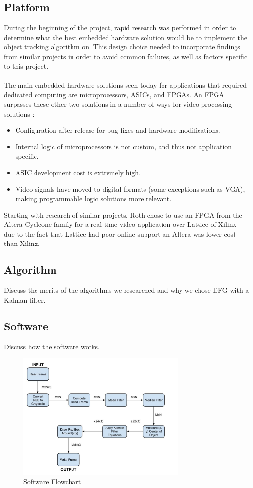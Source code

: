\documentclass[12pt]{article} %
\begin{document}
\subsection{Platform}
During the beginning of the project, rapid research was performed in order to determine what the best embedded hardware solution would be to implement the object tracking algorithm on. This design choice needed to incorporate findings from similar projects in order to avoid common failures, as well as factors specific to this project. \\\\
The main embedded hardware solutions seen today for applications that required dedicated computing are microprocessors, ASICs, and FPGAs. An FPGA surpasses these other two solutions in a number of ways for video processing  solutions \cite{1}:
\begin{itemize}
\item Configuration after release for bug fixes and hardware modifications.
\item Internal logic of microprocessors is not custom, and thus not application specific.
\item ASIC development cost is extremely high.
\item Video signals have moved to digital formats (some exceptions such as VGA), making programmable logic solutions more relevant.
\end{itemize}
Starting with research of similar projects, Roth \cite{1} chose to use an FPGA from the Altera Cyclcone family for a real-time video application over Lattice of Xilinx due to the fact that Lattice had poor online support an Altera was lower cost than Xilinx. 
\subsection{Algorithm}
Discuss the merits of the algorithms we researched and why we chose DFG with a Kalman filter.
\subsection{Software}
Discuss how the software works.
\begin{figure}[h]
\centering
\includegraphics[width=0.75\textwidth]{./images/software_flow.jpg}
\caption{Software Flowchart}
\label{fig:sw_flow}    
\end{figure}
\end{document}
